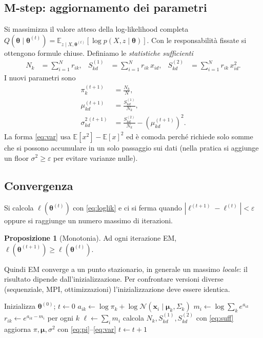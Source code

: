 \documentclass[11pt,a4paper]{article}
\newcommand{\bx}{\mathbf{x}}
\newcommand{\bmu}{\boldsymbol{\mu}}
\newcommand{\bth}{\boldsymbol{\theta}}
\newcommand{\Nrm}{\mathcal{N}}
\newcommand{\E}{\mathbb{E}}
\theoremstyle{definition}
\newtheorem{prop}{Proposizione}
\begin{document}
\subsection{M-step: aggiornamento dei parametri}
Si massimizza il valore atteso della log-likelihood completa
$Q(\bth\mid\bth^{(t)})=\E_{z\mid X,\bth^{(t)}}[\log p(X,z\mid\bth)]$. Con le
responsabilità fissate si ottengono formule chiuse. Definiamo le
\emph{statistiche sufficienti}
\begin{align}
N_k &= \sum_{i=1}^{N} r_{ik}, &
S_{kd}^{(1)} &= \sum_{i=1}^{N} r_{ik}\,x_{id}, &
S_{kd}^{(2)} &= \sum_{i=1}^{N} r_{ik}\,x_{id}^2.
\label{eq:suff}
\end{align}
I nuovi parametri sono
\begin{align}
\pi_k^{(t+1)} &= \frac{N_k}{N}, \label{eq:pi}\\
\mu_{kd}^{(t+1)} &= \frac{S_{kd}^{(1)}}{N_k}, \label{eq:mu}\\
\sigma_{kd}^{2\,(t+1)} &= \frac{S_{kd}^{(2)}}{N_k}-\left(\mu_{kd}^{(t+1)}\right)^2.
\label{eq:var}
\end{align}
La forma \eqref{eq:var} usa $\E[x^2]-\E[x]^2$ ed è comoda perché richiede solo
somme che si possono accumulare in un solo passaggio sui dati (nella pratica si
aggiunge un floor $\sigma^2\ge\varepsilon$ per evitare varianze nulle).

\subsection{Convergenza}
Si calcola $\ell(\bth^{(t)})$ con \eqref{eq:loglik} e ci si ferma quando
$|\ell^{(t+1)}-\ell^{(t)}|<\varepsilon$ oppure si raggiunge un numero massimo di
iterazioni.

\begin{prop}[Monotonia]
Ad ogni iterazione EM, $\ell(\bth^{(t+1)})\ge\ell(\bth^{(t)})$.
\end{prop}
\noindent
Quindi EM converge a un punto stazionario, in generale un massimo \emph{locale}:
il risultato dipende dall'inizializzazione. Per confrontare versioni diverse
(sequenziale, MPI, ottimizzazioni) l'inizializzazione deve essere identica.

\begin{algorithm}[h]
\caption{EM per GMM a covarianza diagonale (sequenziale)}
\begin{algorithmic}[1]
\State Inizializza $\bth^{(0)}$; $t\gets 0$
\Repeat
   
      \State $a_{ik}\gets\log\pi_k+\log\Nrm(\bx_i\mid\bmu_k,\Sigma_k)$ 
    \EndFor
    \State $m_i\gets\log\sum_k e^{a_{ik}}$ 
    \State $r_{ik}\gets e^{a_{ik}-m_i}$ per ogni $k$
  \EndFor
  \State $\ell\gets\sum_i m_i$
  \State calcola $N_k,S^{(1)}_{kd},S^{(2)}_{kd}$ con \eqref{eq:suff} 
  \State aggiorna $\pi,\bmu,\sigma^2$ con \eqref{eq:pi}--\eqref{eq:var}
  \State $t\gets t+1$
\end{algorithmic}
\end{algorithm}
\end{document}
